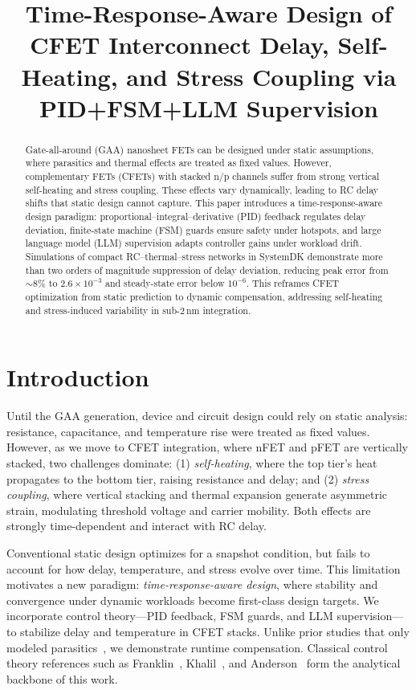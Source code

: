 \documentclass[conference]{IEEEtran}
\title{Time-Response-Aware Design of CFET Interconnect Delay, Self-Heating, and Stress Coupling via PID+FSM+LLM Supervision}
\author{
  \IEEEauthorblockN{Shinichi Samizo}
  \IEEEauthorblockA{Independent Semiconductor Researcher\\
  Project Design Hub, Samizo-AITL\\
  \textit{Email:} \href{mailto:shin3t72@gmail.com}{shin3t72@gmail.com}\quad
  \textit{GitHub:} \href{https://github.com/Samizo-AITL}{Samizo-AITL}}
}
\begin{document}
\maketitle

\begin{abstract}
Gate-all-around (GAA) nanosheet FETs can be designed under static assumptions, where parasitics and thermal effects are treated as fixed values. However, complementary FETs (CFETs) with stacked n/p channels suffer from strong vertical self-heating and stress coupling. These effects vary dynamically, leading to RC delay shifts that static design cannot capture. This paper introduces a time-response-aware design paradigm: proportional--integral--derivative (PID) feedback regulates delay deviation, finite-state machine (FSM) guards ensure safety under hotspots, and large language model (LLM) supervision adapts controller gains under workload drift. Simulations of compact RC--thermal--stress networks in SystemDK demonstrate more than two orders of magnitude suppression of delay deviation, reducing peak error from $\sim$8\% to $2.6\times 10^{-3}$ and steady-state error below $10^{-6}$. This reframes CFET optimization from static prediction to dynamic compensation, addressing self-heating and stress-induced variability in sub-2\,nm integration.
\end{abstract}

\section{Introduction}
Until the GAA generation, device and circuit design could rely on static analysis: resistance, capacitance, and temperature rise were treated as fixed values. However, as we move to CFET integration, where nFET and pFET are vertically stacked, two challenges dominate: (1) \emph{self-heating}, where the top tier's heat propagates to the bottom tier, raising resistance and delay; and (2) \emph{stress coupling}, where vertical stacking and thermal expansion generate asymmetric strain, modulating threshold voltage and carrier mobility. Both effects are strongly time-dependent and interact with RC delay.

Conventional static design optimizes for a snapshot condition, but fails to account for how delay, temperature, and stress evolve over time. This limitation motivates a new paradigm: \emph{time-response-aware design}, where stability and convergence under dynamic workloads become first-class design targets. We incorporate control theory---PID feedback, FSM guards, and LLM supervision---to stabilize delay and temperature in CFET stacks. Unlike prior studies that only modeled parasitics~\cite{yakimets2020cfet,irds2023}, we demonstrate runtime compensation. Classical control theory references such as Franklin~\cite{franklin2015feedback}, Khalil~\cite{khalil2002nonlinear}, and Anderson~\cite{anderson2007optimal} form the analytical backbone of this work.
\end{document}
